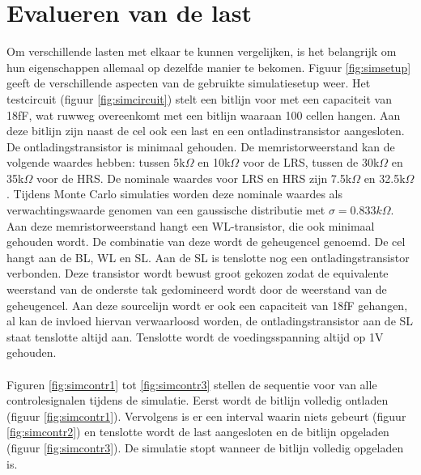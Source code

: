 \section{Evalueren van de last}
Om verschillende lasten met elkaar te kunnen vergelijken, is het belangrijk om hun eigenschappen allemaal op dezelfde manier te bekomen. Figuur \ref{fig:simsetup} geeft de verschillende aspecten van de gebruikte simulatiesetup weer. Het testcircuit (figuur \ref{fig:simcircuit}) stelt een bitlijn voor met een capaciteit van 18fF, wat ruwweg overeenkomt met een bitlijn waaraan 100 cellen hangen. Aan deze bitlijn zijn naast de cel ook een last en een ontladinstransistor aangesloten. De ontladingstransistor is minimaal gehouden. De memristorweerstand kan de volgende waardes hebben: tussen 5k$\Omega$ en 10k$\Omega$ voor de LRS, tussen de 30k$\Omega$ en 35k$\Omega$ voor de HRS. De nominale waardes voor LRS en HRS zijn 7.5k$\Omega$ en 32.5k$\Omega$. Tijdens Monte Carlo simulaties worden deze nominale waardes als verwachtingswaarde genomen van een gaussische distributie met $\sigma = 0.833k\Omega$. Aan deze memristorweerstand hangt een WL-transistor, die ook minimaal gehouden wordt. De combinatie van deze wordt de geheugencel genoemd. De cel hangt aan de BL, WL en SL. Aan de SL is tenslotte nog een ontladingstransistor verbonden. Deze transistor wordt bewust groot gekozen zodat de equivalente weerstand van de onderste tak gedomineerd wordt door de weerstand van de geheugencel. Aan deze sourcelijn wordt er ook een capaciteit van 18fF gehangen, al kan de invloed hiervan verwaarloosd worden, de ontladingstransistor aan de SL staat tenslotte altijd aan. Tenslotte wordt de voedingsspanning altijd op 1V gehouden.\\\\
Figuren \ref{fig:simcontr1} tot \ref{fig:simcontr3} stellen de sequentie voor van alle controlesignalen tijdens de simulatie. Eerst wordt de bitlijn volledig ontladen (figuur \ref{fig:simcontr1}). Vervolgens is er een interval waarin niets gebeurt (figuur \ref{fig:simcontr2}) en tenslotte wordt de last aangesloten en de bitlijn opgeladen (figuur \ref{fig:simcontr3}). De simulatie stopt wanneer de bitlijn volledig opgeladen is.\\

